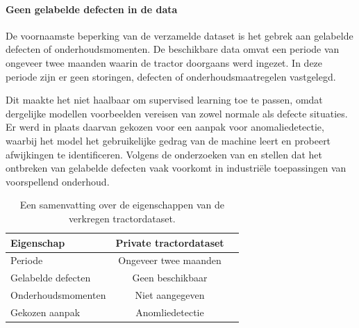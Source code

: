 
\paragraph{Geen gelabelde defecten in de data}

De voornaamste beperking van de verzamelde dataset is het gebrek aan gelabelde defecten of onderhoudsmomenten. De beschikbare data omvat een periode van ongeveer twee maanden waarin de tractor doorgaans werd ingezet. In deze periode zijn er geen storingen, defecten of onderhoudsmaatregelen vastgelegd.

Dit maakte het niet haalbaar om supervised learning toe te passen, omdat dergelijke modellen voorbeelden vereisen van zowel normale als defecte situaties. Er werd in plaats daarvan gekozen voor een aanpak voor anomaliedetectie, waarbij het model het gebruikelijke gedrag van de machine leert en probeert afwijkingen te identificeren. Volgens de onderzoeken van \textcite{Giannoulidis2024} en \textcite{Aggarwal2025} stellen dat het ontbreken van gelabelde defecten vaak voorkomt in industriële toepassingen van voorspellend onderhoud.

\begin{table}[H]
\centering
\begin{tabular}{lcr}
\toprule
\textbf{Eigenschap} & \textbf{Private tractordataset}  \\
\midrule
        Periode                & Ongeveer twee maanden                         \\
        Gelabelde defecten & Geen beschikbaar \\
        Onderhoudsmomenten & Niet aangegeven \\
        Gekozen aanpak & Anomliedetectie \\
\bottomrule
\end{tabular}
\caption[Tabel: samenvatting tractordataset]{\label{tab:tabel samenvatting tractordataset}Een samenvatting over de eigenschappen van de verkregen tractordataset.}
\end{table}


